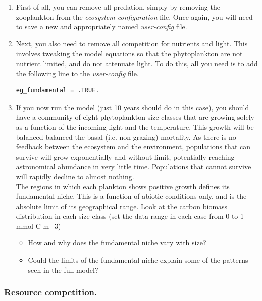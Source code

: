 \documentclass[11pt,fleqn]{book} %
\begin{document}
\vspace{2mm}
\begin{enumerate}[noitemsep]

\item First of all, you can remove all predation, simply by removing the zooplankton from the \textit{ecosystem configuration} file. Once again, you will need to save a new and appropriately named \textit{user-config} file.

\item Next, you also need to remove all competition for nutrients and light. This involves tweaking the model equations so that the phytoplankton are not nutrient limited, and do not attenuate light. To do this, all you need is to add the following line to the \textit{user-config} file.
\small\begin{verbatim}
eg_fundamental = .TRUE.
\end{verbatim}\normalsize

\item If you now run the model (just 10 years should do in this case), you should have a community of eight phytoplankton size classes that are growing solely as a function of the incoming light and the temperature. This growth will be balanced balanced the basal (i.e. non-grazing) mortality. As there is no feedback between the ecosystem and the environment, populations that can survive will grow exponentially and without limit, potentially reaching astronomical abundance in very little time. Populations that cannot survive will rapidly decline to almost nothing.
\\The regions in which each plankton shows positive growth defines its fundamental niche. This is a function of abiotic conditions only, and is the absolute limit of its geographical range. Look at the carbon biomass distribution in each size class (set the data range in each case from 0 to 1 mmol C m${-3}$)
\begin{itemize}
\item How and why does the fundamental niche vary with size?
\item Could the limits of the fundamental niche explain some of the patterns seen in the full model?
\end{itemize}

\end{enumerate}
\vspace{2mm}


\subsubsection*{Resource competition.} 
\end{document}
